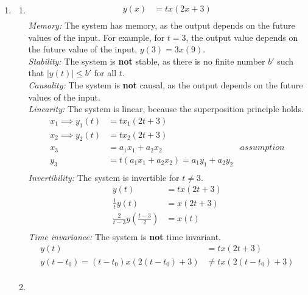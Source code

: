 \documentclass[10pt,a4paper, margin=1in]{article}
\begin{document}
\begin{enumerate}
\item %
    \begin{enumerate}
    \item %
        \begin{align*}
            y(x) & = tx(2x + 3) \\
        \end{align*}
        \textit{Memory: } The system has memory, as the output depends on the future values of the input.
        For example, for $t = 3$, the output value depends on the future value of the input, $y(3) = 3x(9)$.\\
        \textit{Stability: } The system is \textbf{not} stable, as there is no finite number $b'$ such that $|y(t)| \leq b'$ for all $t$.\\
        \textit{Causality: } The system is \textbf{not} causal, as the output depends on the future values of the input.\\
        \textit{Linearity: } The system is linear, because the superposition principle holds.\\
        \begin{align*}
            x_1 \implies y_1(t) & = tx_1(2t + 3) \\
            x_2 \implies y_2(t) & = tx_2(2t + 3) \\
            x_3 & = a_1x_1 + a_2x_2 & assumption\\
            y_3 & = t(a_1x_1 + a_2x_2) = a_1y_1 + a_2y_2 \\
        \end{align*}
        \textit{Invertibility: } The system is invertible for $t \neq 3$.
        \begin{align*}
            y(t) & = tx(2t + 3) \\
            \frac{1}{t}y(t) & = x(2t + 3) \\
            \frac{2}{t - 3}y\left(\frac{t - 3}{2}\right) & = x(t) \\
        \end{align*}
        \textit{Time invariance: } The system is \textbf{not} time invariant.
        \begin{align*}
            y(t) & = tx(2t + 3) \\
            y(t - t_0) = (t-t_0)x(2(t - t_0) + 3) & \neq tx(2(t - t_0) + 3) \\
        \end{align*}
    \item %

\end{enumerate}
\end{enumerate}
\end{document}
